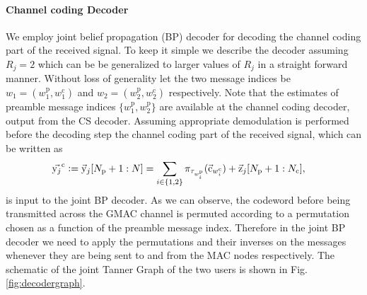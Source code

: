 \paragraph*{Channel coding Decoder}
\label{sec:BP_GMAC}
We employ joint belief propagation (BP) decoder for decoding the channel coding part of the received signal. To keep it simple we describe the decoder assuming $R_j=2$ which can be be generalized to larger values of $R_j$ in a straight forward manner. Without loss of generality let the two message indices be $w_1=(w_1^\mathrm{p},w_1^\mathrm{c})$ and $w_2=(w_2^\mathrm{p},w_2^\mathrm{c})$ respectively. Note that the estimates of preamble message indices $\{w_1^\mathrm{p},w_2^\mathrm{p}\}$ are available at the channel coding decoder, output from the CS decoder. Assuming appropriate demodulation is performed before the decoding step the channel coding part of the received signal, which can be written as
\begin{align*}
\vec{\mathrm{y}_j}^{\mathrm{c}}\mathrel{\mathop:}=  \vec{\mathrm{y}}_j[N_{\mathrm{p}}+1:N] &=\sum_{i\in\{1,2\}} \pi_{\tau_{w_i^\mathrm{p}}}(\vec{\mathrm{c}}_{w_i^{\mathrm{c}}}) +\vec{\mathrm{z}}_j[N_{\mathrm{p}}+1:N_{\mathrm{c}}],
\end{align*}
is input to the joint BP decoder. As we can observe, the codeword before being transmitted across the GMAC channel is permuted according to a permutation chosen as a function of the preamble message index. Therefore in the joint BP decoder we need to apply the permutations and their inverses on the messages whenever they are being sent to and from the MAC nodes respectively. The schematic of the joint Tanner Graph of the two users is shown in Fig. \ref{fig:decodergraph}.


